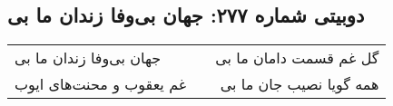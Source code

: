 \begin{center}
\section*{دوبیتی شماره ۲۷۷: جهان بی‌وفا زندان ما بی}
\label{sec:277}
\begin{longtable}{l p{0.5cm} r}
جهان بی‌وفا زندان ما بی
&&
گل غم قسمت دامان ما بی
\\
غم یعقوب و محنت‌های ایوب
&&
همه گویا نصیب جان ما بی
\\
\end{longtable}
\end{center}
